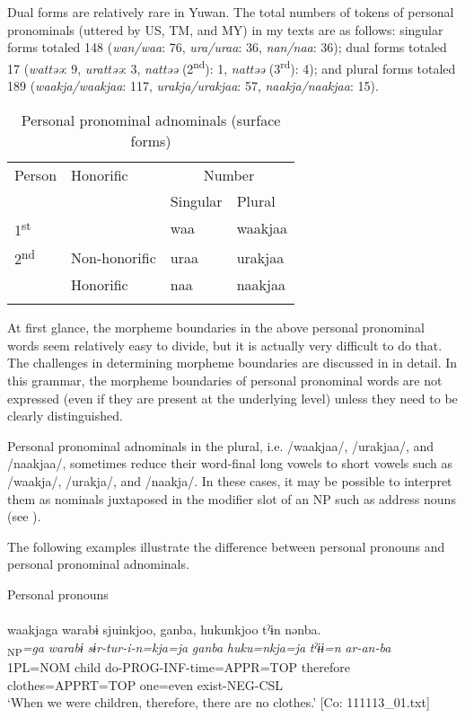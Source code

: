 Dual forms are relatively rare in Yuwan. The total numbers of tokens of personal pronominals (uttered by US, TM, and MY) in my texts are as follows: singular forms totaled 148 (\textit{wan/waa}: 76, \textit{ura/uraa}: 36, \textit{nan/naa}: 36); dual forms totaled 17 (\textit{wattəə}: 9, \textit{urattəə}: 3, \textit{nattəə} (2\textsuperscript{nd}): 1, \textit{nattəə} (3\textsuperscript{rd}): 4); and plural forms totaled 189 (\textit{waakja/waakjaa}: 117, \textit{urakja/urakjaa}: 57, \textit{naakja/naakjaa}: 15). 

\begin{table}
\caption{\label{tab:key:32}Personal pronominal adnominals (surface forms)}
\begin{tabular}{llll}
\lsptoprule
Person  & Honorific & \multicolumn{2}{c}{Number}\\\cmidrule(lr){3-4}
        &           &    Singular  & Plural\\\midrule
1\textsuperscript{st} & & waa & waakjaa\\
2\textsuperscript{nd} & Non-honorific & uraa & urakjaa\\
                      & Honorific     & naa  & naakjaa\\\lspbottomrule
\end{tabular}
\end{table}

At first glance, the morpheme boundaries in the above personal pronominal words seem relatively easy to divide, but it is actually very difficult to do that. The challenges in determining morpheme boundaries are discussed in  in detail. In this grammar, the morpheme boundaries of personal pronominal words are not expressed (even if they are present at the underlying level) unless they need to be clearly distinguished.

Personal pronominal adnominals in the plural, i.e. /waakjaa/, /urakjaa/, and /naakjaa/, sometimes reduce their word-final long vowels to short vowels such as /waakja/, /urakja/, and /naakja/. In these cases, it may be possible to interpret them as nominals juxtaposed in the modifier slot of an NP such as address nouns (see ).

  The following examples illustrate the difference between personal pronouns and personal pronominal adnominals.

\ea \label{ex:5:1}  \ea \label{ex:5:1a} Personal pronouns\\\\
\glll  waakjaga  warabɨ  sjuinkjoo,  ganba,  hukunkjoo  tˀɨn  nənba.\\
[\textit{waakja}\textsubscript{Head}]\textsubscript{NP}\textit{=ga}  \textit{warabɨ}  \textit{sɨr-tur-i-n=kja=ja}  \textit{ganba} \textit{huku=nkja=ja}  \textit{tˀɨɨ=n}  \textit{ar-an-ba}\\
1PL=NOM  child  do-PROG-INF-time=APPR=TOP  therefore   clothes=APPRT=TOP  one=even  exist-NEG-CSL\\
\glt ‘When we were children, therefore, there are no clothes.’ [Co: 111113\_01.txt]

